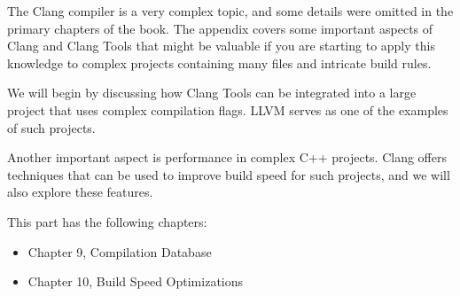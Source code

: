 The Clang compiler is a very complex topic, and some details were omitted in the primary chapters of the book. The appendix covers some important aspects of Clang and Clang Tools that might be valuable if you are starting to apply this knowledge to complex projects containing many files and intricate build rules.

We will begin by discussing how Clang Tools can be integrated into a large project that uses complex compilation flags. LLVM serves as one of the examples of such projects.

Another important aspect is performance in complex C++ projects. Clang offers techniques that can be used to improve build speed for such projects, and we will also explore these features.

This part has the following chapters:

\begin{itemize}
\item
Chapter 9, Compilation Database

\item
Chapter 10, Build Speed Optimizations
\end{itemize}